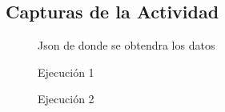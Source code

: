 \documentclass{article}
\begin{document}
  \subsection{Capturas de la Actividad}
  \begin{figure}[H]
    \centering
    \caption{Json de donde se obtendra los datos}
  \end{figure}
  \begin{figure}[H]
    \centering
    \caption{Ejecución 1}
  \end{figure}
  \begin{figure}[H]
    \centering
    \caption{Ejecución 2}
  \end{figure}
\end{document}
